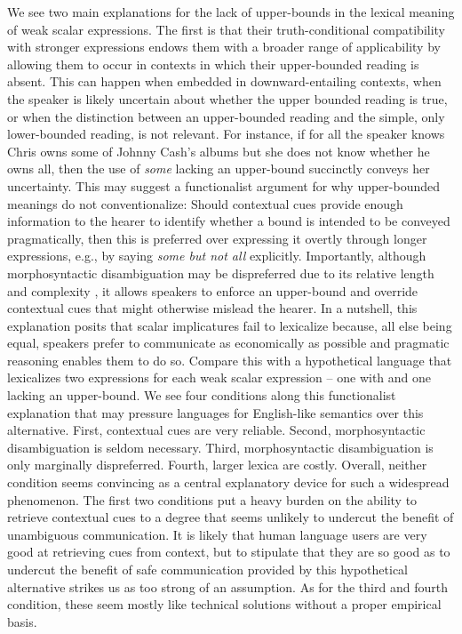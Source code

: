 \documentclass[a4paper]{article}
\begin{document}
We see two main explanations for the lack of upper-bounds in the lexical meaning of weak scalar expressions. The first is that their truth-conditional compatibility with stronger expressions endows them with a broader range of applicability by allowing them to occur in contexts in which their upper-bounded reading is absent. This can happen when embedded in downward-entailing contexts, when the speaker is likely uncertain about whether the upper bounded reading is true, or when the distinction between an upper-bounded reading and the simple, only lower-bounded reading, is not relevant. For instance, if for all the speaker knows Chris owns some of Johnny Cash's albums but she does not know whether he owns all, then the use of {\em some} lacking an upper-bound succinctly conveys her uncertainty. This may suggest a functionalist argument for why upper-bounded meanings do not conventionalize: Should contextual cues provide enough information to the hearer to identify whether a bound is intended to be conveyed pragmatically, then this is preferred over expressing it overtly through longer expressions, e.g., by saying {\em some but not all} explicitly. Importantly, although morphosyntactic disambiguation may be dispreferred due to its relative length and complexity \citep{piantadosi+etal:2012b}, it allows speakers to enforce an upper-bound and override contextual cues that might otherwise mislead the hearer. In a nutshell, this explanation posits that scalar implicatures fail to lexicalize because, all else being equal, speakers prefer to communicate as economically as possible and pragmatic reasoning enables them to do so. Compare this with a hypothetical language that lexicalizes two expressions for each weak scalar expression -- one with and one lacking an upper-bound. We see four conditions along this functionalist explanation that may pressure languages for English-like semantics over this alternative. First, contextual cues are very reliable. Second, morphosyntactic disambiguation is seldom necessary. Third, morphosyntactic disambiguation is only marginally dispreferred. Fourth, larger lexica are costly. Overall, neither condition seems convincing as a central explanatory device for such a widespread phenomenon. The first two conditions put a heavy burden on the ability to retrieve contextual cues to a degree that seems unlikely to undercut the benefit of unambiguous communication. It is likely that human language users are very good at retrieving cues from context, but to stipulate that they are so good as to undercut the benefit of safe communication provided by this hypothetical alternative strikes us as too strong of an assumption.  As for the third and fourth condition, these seem mostly like technical solutions without a proper empirical basis. 
\end{document}
